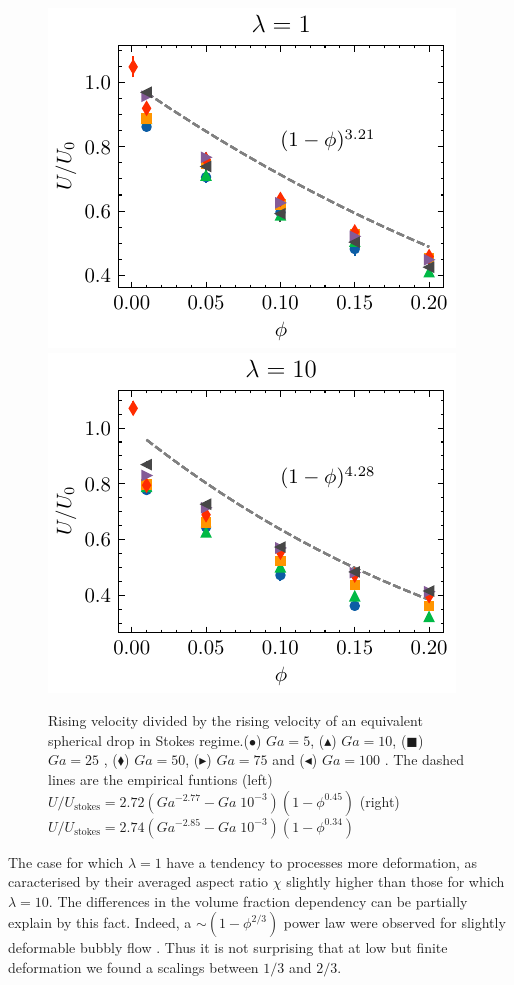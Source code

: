 \begin{figure}[h!]
    \centering
    \includegraphics[height = 0.35\textwidth]{image/HOMOGENEOUS/fCA/Re_iso_N_5_l_1.pdf}
    \includegraphics[height = 0.35\textwidth]{image/HOMOGENEOUS/fCA/Re_iso_N_5_l_10.pdf}
    \caption{Rising velocity divided by the rising velocity of an equivalent spherical drop in Stokes regime.($\bullet$) $Ga = 5$, ($\blacktriangle$) $Ga = 10$, ($\blacksquare$) $Ga = 25$ , ($\blacklozenge$) $Ga = 50$, ($\blacktriangleright$) $Ga = 75$ and ($\blacktriangleleft$) $Ga = 100$ . 
    The dashed lines are the empirical funtions (left)  
    $U/U_\text{stokes} = 2.72(Ga^{-2.77} - Ga\;10^{-3}) (1 - \phi^{0.45})$
    (right)  $U/U_\text{stokes} = 2.74(Ga^{-2.85} - Ga \;10^{-3}) (1 - \phi^{0.34})$ }
    \label{fig:U}
\end{figure}

The case for which $\lambda = 1$ have a tendency to processes more deformation, as caracterised by their averaged aspect ratio $\chi$ slightly higher than those for which $\lambda = 10$. 
The differences in the volume fraction dependency can be partially explain by this fact. 
Indeed, a  $\sim (1 - \phi^{2/3})$ power law were observed for slightly deformable bubbly flow \cite{zhang2021direct}. 
Thus it is not surprising that at low but finite deformation we found a scalings between $1/3$ and $2/3$. 

